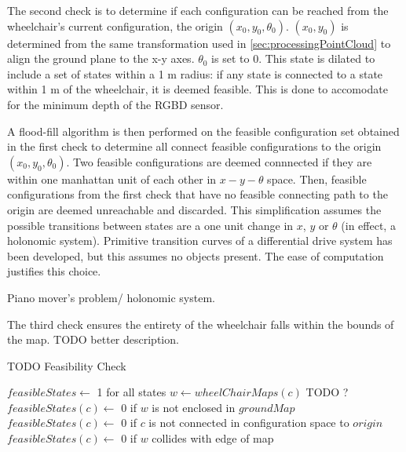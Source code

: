 The second check is to determine if each configuration can be reached from the
wheelchair's current configuration, the origin $(x_0,y_0,\theta_0)$. $(x_0,y_0)$
is determined from the same transformation used in
\autoref{sec:processingPointCloud} to align the ground plane to the x-y axes.
$\theta_0$ is set to $0$. 
This state is dilated to include a set of states within a 1 m radius: if any
state is connected to a state within 1 m of the wheelchair, it is deemed
feasible. This is done to accomodate for the minimum depth of the RGBD sensor.


A flood-fill algorithm is then performed on the
feasible configuration set obtained in the first check to determine all connect
feasible configurations to the origin $(x_0,y_0,\theta_0)$. Two feasible
configurations are deemed connnected if they are within one manhattan unit of
each other in $x-y-\theta$ space.
Then, feasible configurations from the first check that have no feasible
connecting path to the origin are deemed unreachable and discarded. 
This simplification assumes the possible transitions between states are a one
unit change in $x$, $y$ or $\theta$ (in effect, a holonomic system). 
Primitive transition curves of a differential drive system
\cite{balkcom2002time} has been developed, but this assumes no objects present.
The ease of computation justifies this choice.

Piano mover's problem/ holonomic system.


The third check ensures the entirety of the wheelchair falls within the bounds
of the map. TODO better description.

\begin{algorithm}
\caption{TODO Feasibility Check}
\label{alg:feasibilitycheck}
\begin{algorithmic}[1]
\Statex
{}
    \State $feasibleStates \gets$ 1 for all states
        \State $w \gets wheelChairMaps(c)$ TODO ?
        \State $feasibleStates(c) \gets$ 0 if $w$ is not enclosed in $groundMap$
        \State $feasibleStates(c) \gets$ 0 if $c$ is not connected in configuration space to $origin$
        \State $feasibleStates(c) \gets$ 0 if $w$ collides with edge of map
    \EndFor
\EndFunction
\Statex
{}
\end{algorithmic}
\end{algorithm}


